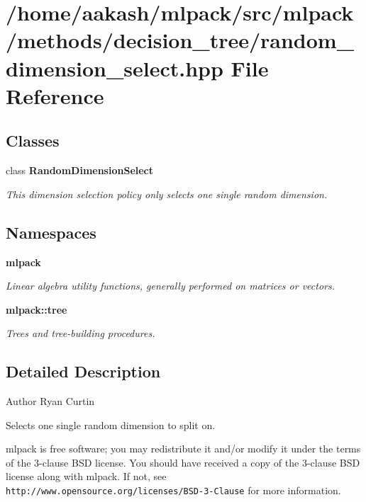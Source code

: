 \section{/home/aakash/mlpack/src/mlpack/methods/decision\+\_\+tree/random\+\_\+dimension\+\_\+select.hpp File Reference}
\label{random__dimension__select_8hpp}
\subsection*{Classes}
\begin{DoxyCompactItemize}
\item 
class \textbf{ Random\+Dimension\+Select}
\begin{DoxyCompactList}\small\item\em This dimension selection policy only selects one single random dimension. \end{DoxyCompactList}\end{DoxyCompactItemize}
\subsection*{Namespaces}
\begin{DoxyCompactItemize}
\item 
 \textbf{ mlpack}
\begin{DoxyCompactList}\small\item\em Linear algebra utility functions, generally performed on matrices or vectors. \end{DoxyCompactList}\item 
 \textbf{ mlpack\+::tree}
\begin{DoxyCompactList}\small\item\em Trees and tree-\/building procedures. \end{DoxyCompactList}\end{DoxyCompactItemize}


\subsection{Detailed Description}
\begin{DoxyAuthor}{Author}
Ryan Curtin
\end{DoxyAuthor}
Selects one single random dimension to split on.

mlpack is free software; you may redistribute it and/or modify it under the terms of the 3-\/clause B\+SD license. You should have received a copy of the 3-\/clause B\+SD license along with mlpack. If not, see {\tt http\+://www.\+opensource.\+org/licenses/\+B\+S\+D-\/3-\/\+Clause} for more information. 